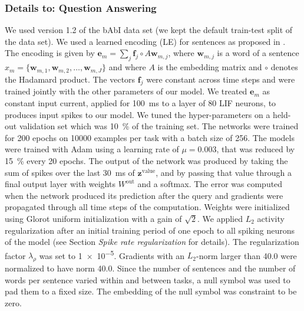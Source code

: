 \documentclass{article}
\newcommand{\vm}[1]{\bm{#1}}
\begin{document}
\subsubsection*{Details to: Question Answering}
We used version 1.2 of the bAbI data set (we kept the default train-test split of the data set). We used a learned encoding (LE) for sentences as proposed in \cite{henaff2017tracking}. The encoding is given by $\vm{e}_m = \sum_j \vm{f}_j \circ A\vm{w}_{m,j}$, where $\vm{w}_{m,j}$ is a word of a sentence $x_m = \{\vm{w}_{m,1}, \vm{w}_{m,2}, \dots, \vm{w}_{m,J}\}$ and where $A$ is the embedding matrix and $\circ$ denotes the Hadamard product. The vectors $\vm{f}_j$ were constant across time steps and were trained jointly with the other parameters of our model. We treated $\vm{e}_m$ as constant input current, applied for \SI{100}{ms} to a layer of \num{80} \gls{LIF} neurons, to produces input spikes to our model. We tuned the hyper-parameters on a held-out validation set which was \SI{10}{\percent} of the training set. The networks were trained for \num{200} epochs on \num{10000} examples per task with a batch size of \num{256}. The models were trained with Adam \cite{kingma2014adam} using a learning rate of $\mu = 0.003$, that was reduced by \SI{15}{\percent} every \num{20} epochs. The output of the network was produced by taking the sum of spikes over the last \SI{30}{ms} of $\vm{z}^\mathrm{value}$, and by passing that value through a final output layer with weights $W^\mathrm{out}$ and a softmax. The error was computed when the network produced its prediction after the query and gradients were propagated through all time steps of the computation. Weights were initialized using Glorot uniform initialization \cite{glorot2010understanding} with a gain of $\sqrt{2}$. We applied $L_2$ activity regularization after an initial training period of one epoch to all spiking neurons of the model (see Section \emph{Spike rate regularization} for details). The regularization factor $\lambda_{\rho}$ was set to \num{1e-5}. Gradients with an $L_2$-norm larger than \num{40.0} were normalized to have norm \num{40.0}. Since the number of sentences and the number of words per sentence varied within and between tasks, a null symbol was used to pad them to a fixed size. The embedding of the null symbol was constraint to be zero.
\end{document}
